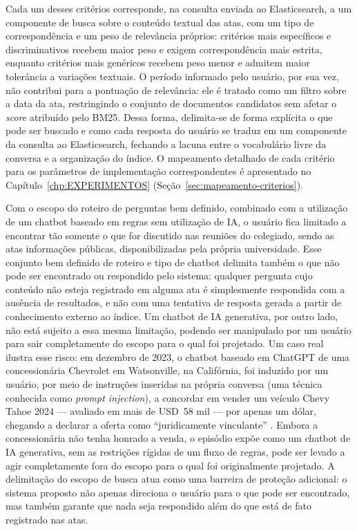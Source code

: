 Cada um desses critérios corresponde, na consulta enviada ao Elasticsearch, a um componente de busca sobre o conteúdo textual das atas, com um tipo de correspondência e um peso de relevância próprios: critérios mais específicos e discriminativos recebem maior peso e exigem correspondência mais estrita, enquanto critérios mais genéricos recebem peso menor e admitem maior tolerância a variações textuais. O período informado pelo usuário, por sua vez, não contribui para a pontuação de relevância: ele é tratado como um filtro sobre a data da ata, restringindo o conjunto de documentos candidatos sem afetar o \textit{score} atribuído pelo BM25. Dessa forma, delimita-se de forma explícita o que pode ser buscado e como cada resposta do usuário se traduz em um componente da consulta ao Elasticsearch, fechando a lacuna entre o vocabulário livre da conversa e a organização do índice. O mapeamento detalhado de cada critério para os parâmetros de implementação correspondentes é apresentado no Capítulo~\ref{chp:EXPERIMENTOS} (Seção~\ref{sec:mapeamento-criterios}).

Com o escopo do roteiro de perguntas bem definido, combinado com a utilização de um chatbot baseado em regras sem utilização de IA, o usuário fica limitado a encontrar tão somente o que for discutido nas reuniões do colegiado, sendo as atas informações públicas, disponibilizadas pela própria universidade. Esse conjunto bem definido de roteiro e tipo de chatbot delimita também o que não pode ser encontrado ou respondido pelo sistema: qualquer pergunta cujo conteúdo não esteja registrado em alguma ata é simplesmente respondida com a ausência de resultados, e não com uma tentativa de resposta gerada a partir de conhecimento externo ao índice. Um chatbot de IA generativa, por outro lado, não está sujeito a essa mesma limitação, podendo ser manipulado por um usuário para sair completamente do escopo para o qual foi projetado. Um caso real ilustra esse risco: em dezembro de 2023, o chatbot baseado em ChatGPT de uma concessionária Chevrolet em Watsonville, na Califórnia, foi induzido por um usuário, por meio de instruções inseridas na própria conversa (uma técnica conhecida como \textit{prompt injection}), a concordar em vender um veículo Chevy Tahoe 2024 --- avaliado em mais de USD~58 mil --- por apenas um dólar, chegando a declarar a oferta como ``juridicamente vinculante'' \cite{aiincidentdb622, venturebeat-chevy}. Embora a concessionária não tenha honrado a venda, o episódio expõe como um chatbot de IA generativa, sem as restrições rígidas de um fluxo de regras, pode ser levado a agir completamente fora do escopo para o qual foi originalmente projetado. A delimitação do escopo de busca atua como uma barreira de proteção adicional: o sistema proposto não apenas direciona o usuário para o que pode ser encontrado, mas também garante que nada seja respondido além do que está de fato registrado nas atas.

